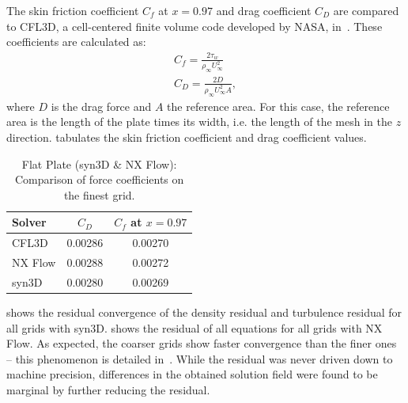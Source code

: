 The skin friction coefficient $C_f$ at $x = 0.97$ and drag coefficient $C_D$ are compared to CFL3D, a cell-centered finite volume code developed by NASA, in~. These coefficients are calculated as:
\begin{align*}
    C_f = \frac{2\tau_w}{\rho_\infty U_\infty^2}\\
    C_D = \frac{2D}{\rho_\infty U_\infty^2 A},
\end{align*}
where $D$ is the drag force and $A$ the reference area. For this case, the reference area is the length of the plate times its width, i.e. the length of the mesh in the $z$ direction.  tabulates the skin friction coefficient and drag coefficient values.
\begin{table}
\centering
\caption{Flat Plate (syn3D \& NX Flow): Comparison of force coefficients on the finest grid.}
\label{tab:flat}
\begin{tabular}{@{}lcc@{}}
    \toprule
    Solver & $C_D$ & $C_f$ at $x=0.97$ \\
    \midrule
    CFL3D & 0.00286 & 0.00270 \\
    NX Flow & 0.00288 & 0.00272 \\
    syn3D & 0.00280 & 0.00269\\
    \bottomrule
\end{tabular}
\end{table}
 shows the residual convergence of the density residual and turbulence residual for all grids with syn3D.  shows the residual of all equations for all grids with NX Flow. As expected, the coarser grids show faster convergence than the finer ones -- this phenomenon is detailed in~\cite{blazek2015computational}. While the residual was never driven down to machine precision, differences in the obtained solution field were found to be marginal by further reducing the residual.
